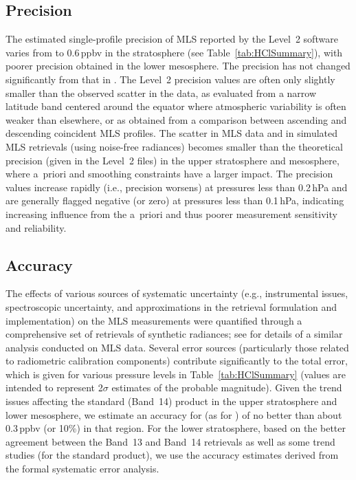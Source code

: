 \subsection{Precision}

The estimated single-profile precision of MLS  reported by the Level~2 software varies from  to 0.6\,ppbv in the stratosphere (see Table~\ref{tab:HClSummary}), with poorer precision obtained in the lower mesosphere. The \thisv precision has not changed significantly from that in \prevv. The Level~2 precision values are often only slightly smaller than the observed scatter in the data, as evaluated from a narrow latitude band centered around the equator where atmospheric variability is often weaker than elsewhere, or as obtained from a comparison between ascending and descending coincident MLS profiles. The scatter in MLS data and in simulated MLS retrievals (using noise-free radiances) becomes smaller than the theoretical precision (given in the Level~2 files) in the upper stratosphere and mesosphere, where a~priori and smoothing constraints have a larger impact. The  precision values increase rapidly (i.e., precision worsens) at pressures less than 0.2\,hPa and are generally flagged negative (or zero) at pressures less than 0.1\,hPa, indicating increasing influence from the a~priori and thus poorer measurement sensitivity and reliability.

\subsection{Accuracy}

The effects of various sources of systematic uncertainty (e.g., instrumental issues, spectroscopic uncertainty, and approximations in the retrieval formulation and implementation) on the MLS \thisv {} measurements were quantified through a comprehensive set of retrievals of synthetic radiances; see \citet{FroidevauxEtal:2008:HCl} for details of a similar analysis conducted on MLS \vii {} data. Several error sources (particularly those related to radiometric calibration components) contribute significantly to the total error, which is given for various pressure levels in Table~\ref{tab:HClSummary} (values are intended to represent 2$\sigma$ estimates of the probable magnitude). Given the trend issues affecting the standard (Band~14)  product in the upper stratosphere and lower mesosphere, we estimate an accuracy for \thisv (as for \prevv) of no better than about 0.3\,ppbv (or 10\%) in that region. For the lower stratosphere, based on the better agreement between the Band~13 and Band~14 retrievals as well as some trend studies (for the standard product), we use the accuracy estimates derived from the formal systematic error analysis.

